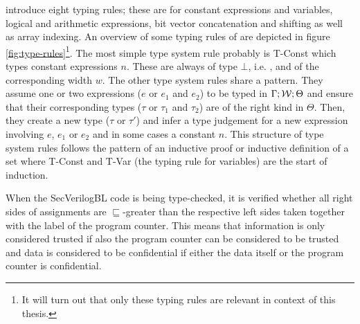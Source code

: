 \citeauthor{Ferraiuolo17} introduce eight typing rules; these are for constant expressions and variables, logical and arithmetic expressions, bit vector concatenation and shifting as well as array indexing.
An overview of some typing rules of \cite{Ferraiuolo17} are depicted in figure \ref{fig:type-rules}\footnote{%
    It will turn out that only these typing rules are relevant in context of this thesis.
}.
The most simple type system rule probably is T-Const which types constant expressions $ n $.
These are always of type $ \bot $, i.e. \PT, and of the corresponding width $ w $.
The other type system rules share a pattern.
They assume one or two expressions ($ e $ or $ e_1 $ and $ e_2 $) to be typed in $ \Gamma; \mathcal{W}; \Theta $ and ensure that their corresponding types ($ \tau $ or $ \tau_1 $ and $ \tau_2 $) are of the right kind in $ \Theta $.
Then, they create a new type ($ \tau $ or $ \tau' $) and infer a type judgement for a new expression involving $ e $, $ e_1 $ or $ e_2 $ and in some cases a constant $ n $.
This structure of type system rules follows the pattern of an inductive proof or inductive definition of a set where T-Const and T-Var (the typing rule for variables) are the start of induction.

When the SecVerilogBL code is being type-checked, it is verified whether all right sides of assignments are $ \sqsubseteq $-greater than the respective left sides taken together with the label of the program counter.
This means that information is only considered trusted if also the program counter can be considered to be trusted and data is considered to be confidential if either the data itself or the program counter is confidential.

